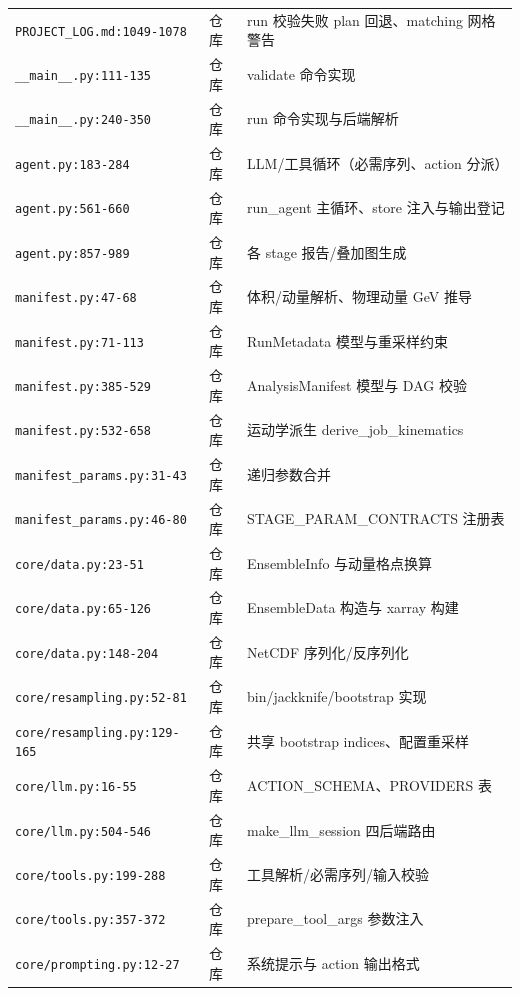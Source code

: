 \documentclass[UTF8]{ctexart}
\begin{document}
\begin{xltabular}{\textwidth}{llX}
\texttt{\nolinkurl{PROJECT_LOG.md:1049-1078}} & 仓库 & run 校验失败 plan 回退、matching 网格警告\\
\texttt{\nolinkurl{__main__.py:111-135}} & 仓库 & validate 命令实现\\
\texttt{\nolinkurl{__main__.py:240-350}} & 仓库 & run 命令实现与后端解析\\
\texttt{\nolinkurl{agent.py:183-284}} & 仓库 & LLM/工具循环（必需序列、action 分派）\\
\texttt{\nolinkurl{agent.py:561-660}} & 仓库 & run\_agent 主循环、store 注入与输出登记\\
\texttt{\nolinkurl{agent.py:857-989}} & 仓库 & 各 stage 报告/叠加图生成\\
\texttt{\nolinkurl{manifest.py:47-68}} & 仓库 & 体积/动量解析、物理动量 GeV 推导\\
\texttt{\nolinkurl{manifest.py:71-113}} & 仓库 & RunMetadata 模型与重采样约束\\
\texttt{\nolinkurl{manifest.py:385-529}} & 仓库 & AnalysisManifest 模型与 DAG 校验\\
\texttt{\nolinkurl{manifest.py:532-658}} & 仓库 & 运动学派生 derive\_job\_kinematics\\
\texttt{\nolinkurl{manifest_params.py:31-43}} & 仓库 & 递归参数合并\\
\texttt{\nolinkurl{manifest_params.py:46-80}} & 仓库 & STAGE\_PARAM\_CONTRACTS 注册表\\
\texttt{\nolinkurl{core/data.py:23-51}} & 仓库 & EnsembleInfo 与动量格点换算\\
\texttt{\nolinkurl{core/data.py:65-126}} & 仓库 & EnsembleData 构造与 xarray 构建\\
\texttt{\nolinkurl{core/data.py:148-204}} & 仓库 & NetCDF 序列化/反序列化\\
\texttt{\nolinkurl{core/resampling.py:52-81}} & 仓库 & bin/jackknife/bootstrap 实现\\
\texttt{\nolinkurl{core/resampling.py:129-165}} & 仓库 & 共享 bootstrap indices、配置重采样\\
\texttt{\nolinkurl{core/llm.py:16-55}} & 仓库 & ACTION\_SCHEMA、PROVIDERS 表\\
\texttt{\nolinkurl{core/llm.py:504-546}} & 仓库 & make\_llm\_session 四后端路由\\
\texttt{\nolinkurl{core/tools.py:199-288}} & 仓库 & 工具解析/必需序列/输入校验\\
\texttt{\nolinkurl{core/tools.py:357-372}} & 仓库 & prepare\_tool\_args 参数注入\\
\texttt{\nolinkurl{core/prompting.py:12-27}} & 仓库 & 系统提示与 action 输出格式\\

\end{xltabular}
\end{document}
